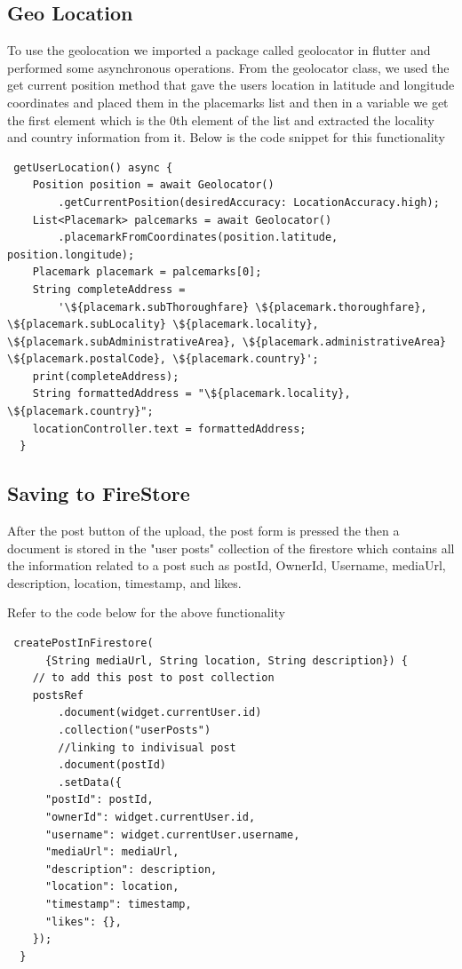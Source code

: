 \subsection{Geo Location}
To use the geolocation we imported a package called geolocator in flutter and performed some asynchronous operations. From the geolocator class, we used the get current position method that gave the users location in latitude and longitude coordinates and placed them in the placemarks list and then in a variable we get the first element which is the 0th element of the list and extracted the locality and country information from it.
Below is the code snippet for this functionality

\begin{verbatim}
 getUserLocation() async {
    Position position = await Geolocator()
        .getCurrentPosition(desiredAccuracy: LocationAccuracy.high);
    List<Placemark> palcemarks = await Geolocator()
        .placemarkFromCoordinates(position.latitude, position.longitude);
    Placemark placemark = palcemarks[0];
    String completeAddress =
        '\${placemark.subThoroughfare} \${placemark.thoroughfare}, \${placemark.subLocality} \${placemark.locality}, \${placemark.subAdministrativeArea}, \${placemark.administrativeArea} \${placemark.postalCode}, \${placemark.country}';
    print(completeAddress);
    String formattedAddress = "\${placemark.locality}, \${placemark.country}";
    locationController.text = formattedAddress;
  }
\end{verbatim}

\subsection{Saving to FireStore}
After the post button of the upload, the post form is pressed the then a document is stored in the "user posts" collection of the firestore which contains all the information related to a post such as postId, OwnerId, Username, mediaUrl, description, location, timestamp, and likes.

Refer to the code below for the above functionality

\begin{verbatim}
 createPostInFirestore(
      {String mediaUrl, String location, String description}) {
    // to add this post to post collection
    postsRef
        .document(widget.currentUser.id)
        .collection("userPosts")
        //linking to indivisual post
        .document(postId)
        .setData({
      "postId": postId,
      "ownerId": widget.currentUser.id,
      "username": widget.currentUser.username,
      "mediaUrl": mediaUrl,
      "description": description,
      "location": location,
      "timestamp": timestamp,
      "likes": {},
    });
  }
\end{verbatim}

